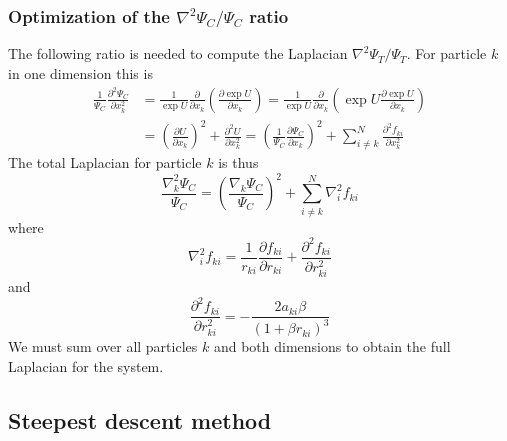 \documentclass[english, a4paper]{article}
\begin{document}
\subsubsection{Optimization of the $\nabla^2 \Psi_C / \Psi_C$ ratio}
The following ratio is needed to compute the Laplacian $\nabla^2 \Psi_T / \Psi_T$. 
For particle $k$ in one dimension this is
\begin{align}
 \frac{1}{\Psi_C}\frac{\partial^2 \Psi_C}{\partial x_k^2} &= 
 \frac{1}{\exp{U}}\frac{\partial}{\partial x_k}\left(\frac{\partial \exp{U}}{\partial x_k}\right) = 
 \frac{1}{\exp{U}}\frac{\partial}{\partial x_k}\left(\exp{U}\frac{\partial \exp{U}}{\partial x_k}\right)\\ &= 
 \left(\frac{\partial U}{\partial x_k}\right)^2 + \frac{\partial^2 U}{\partial x_k^2} =
 \left(\frac{1}{\Psi_C}\frac{\partial \Psi_C}{\partial x_k}\right)^2 + 
 \sum_{i\neq k}^N \frac{\partial^2 f_{ki}}{\partial x_k^2}
\end{align}
The total Laplacian for particle $k$ is thus
\begin{equation}
 \frac{\nabla^2_k \Psi_C}{\Psi_C} = \left(\frac{\nabla_k \Psi_C}{\Psi_C}\right)^2 + 
 \sum_{i\neq k}^N \nabla_i^2 f_{ki}
\end{equation}
where
\begin{equation}
 \nabla_i^2 f_{ki}  = 
 \frac{1}{r_{ki}}\frac{\partial f_{ki}}{\partial r_{ki}} + \frac{\partial^2 f_{ki}}{\partial r_{ki}^2}
\end{equation}
and 
\begin{equation}
 \frac{\partial^2 f_{ki}}{\partial r_{ki}^2} = -\frac{2a_{ki}\beta}{(1 + \beta r_{ki})^3}
\end{equation}
We must sum over all particles $k$ and both dimensions to obtain the full Laplacian for the system.




\subsection{Steepest descent method}
\end{document}
